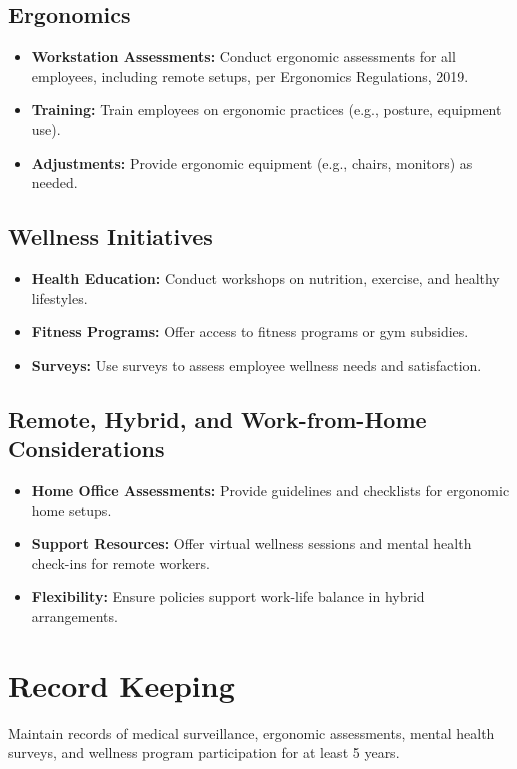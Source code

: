 \documentclass[11pt]{article}
\begin{document}
\subsection{Ergonomics}
\begin{itemize}
    \item \textbf{Workstation Assessments:} Conduct ergonomic assessments for all employees, including remote setups, per Ergonomics Regulations, 2019.
    \item \textbf{Training:} Train employees on ergonomic practices (e.g., posture, equipment use).
    \item \textbf{Adjustments:} Provide ergonomic equipment (e.g., chairs, monitors) as needed.
\end{itemize}

\subsection{Wellness Initiatives}
\begin{itemize}
    \item \textbf{Health Education:} Conduct workshops on nutrition, exercise, and healthy lifestyles.
    \item \textbf{Fitness Programs:} Offer access to fitness programs or gym subsidies.
    \item \textbf{Surveys:} Use surveys to assess employee wellness needs and satisfaction.
\end{itemize}

\subsection{Remote, Hybrid, and Work-from-Home Considerations}
\begin{itemize}
    \item \textbf{Home Office Assessments:} Provide guidelines and checklists for ergonomic home setups.
    \item \textbf{Support Resources:} Offer virtual wellness sessions and mental health check-ins for remote workers.
    \item \textbf{Flexibility:} Ensure policies support work-life balance in hybrid arrangements.
\end{itemize}

\section{Record Keeping}
Maintain records of medical surveillance, ergonomic assessments, mental health surveys, and wellness program participation for at least 5 years.
\end{document}
